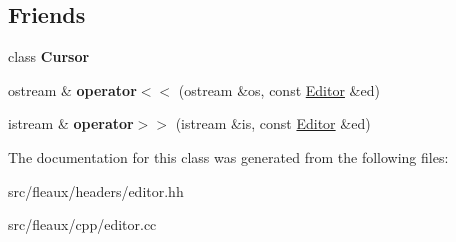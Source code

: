 \subsection*{Friends}
\begin{DoxyCompactItemize}
\item 
\hypertarget{classFleaux_1_1Editor_a9591eb6f6543f40292912e27b74f4d27}{}class {\bfseries Cursor}\label{classFleaux_1_1Editor_a9591eb6f6543f40292912e27b74f4d27}

\item 
\hypertarget{classFleaux_1_1Editor_af98d2646eda16034a2ac994bfa661135}{}ostream \& {\bfseries operator$<$$<$} (ostream \&os, const \hyperlink{classFleaux_1_1Editor}{Editor} \&ed)\label{classFleaux_1_1Editor_af98d2646eda16034a2ac994bfa661135}

\item 
\hypertarget{classFleaux_1_1Editor_a335762e6c7e08e62f01e80c58fa08447}{}istream \& {\bfseries operator$>$$>$} (istream \&is, const \hyperlink{classFleaux_1_1Editor}{Editor} \&ed)\label{classFleaux_1_1Editor_a335762e6c7e08e62f01e80c58fa08447}

\end{DoxyCompactItemize}


The documentation for this class was generated from the following files\+:\begin{DoxyCompactItemize}
\item 
src/fleaux/headers/editor.\+hh\item 
src/fleaux/cpp/editor.\+cc\end{DoxyCompactItemize}
